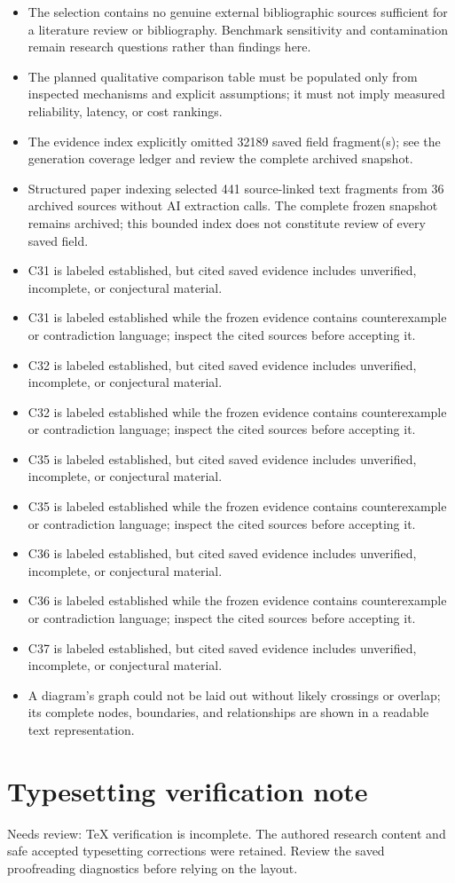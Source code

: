 \documentclass[11pt]{article}
\begin{document}
\begin{itemize}
\item The selection contains no genuine external bibliographic sources sufficient for a literature review or bibliography. Benchmark sensitivity and contamination remain research questions rather than findings here.
\item The planned qualitative comparison table must be populated only from inspected mechanisms and explicit assumptions; it must not imply measured reliability, latency, or cost rankings.
\item The evidence index explicitly omitted 32189 saved field fragment(s); see the generation coverage ledger and review the complete archived snapshot.
\item Structured paper indexing selected 441 source-linked text fragments from 36 archived sources without AI extraction calls. The complete frozen snapshot remains archived; this bounded index does not constitute review of every saved field.
\item C31 is labeled established, but cited saved evidence includes unverified, incomplete, or conjectural material.
\item C31 is labeled established while the frozen evidence contains counterexample or contradiction language; inspect the cited sources before accepting it.
\item C32 is labeled established, but cited saved evidence includes unverified, incomplete, or conjectural material.
\item C32 is labeled established while the frozen evidence contains counterexample or contradiction language; inspect the cited sources before accepting it.
\item C35 is labeled established, but cited saved evidence includes unverified, incomplete, or conjectural material.
\item C35 is labeled established while the frozen evidence contains counterexample or contradiction language; inspect the cited sources before accepting it.
\item C36 is labeled established, but cited saved evidence includes unverified, incomplete, or conjectural material.
\item C36 is labeled established while the frozen evidence contains counterexample or contradiction language; inspect the cited sources before accepting it.
\item C37 is labeled established, but cited saved evidence includes unverified, incomplete, or conjectural material.
\item A diagram's graph could not be laid out without likely crossings or overlap; its complete nodes, boundaries, and relationships are shown in a readable text representation.
\end{itemize}
\section*{Typesetting verification note}
Needs review: TeX verification is incomplete. The authored research content and safe accepted typesetting corrections were retained. Review the saved proofreading diagnostics before relying on the layout.
\end{document}
